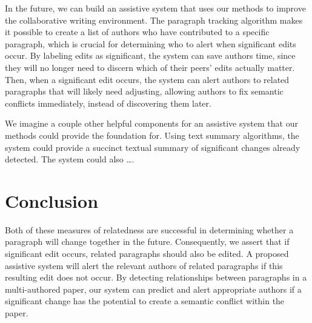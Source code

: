 In the future, we can build an assistive system that uses our methods to
improve the collaborative writing environment. The paragraph tracking
algorithm makes it possible to create a list of authors who have
contributed to a specific paragraph, which is crucial for determining
who to alert when significant edits occur. By labeling edits as
significant, the system can save authors time, since they will no longer
need to discern which of their peers' edits actually matter. Then, when
a significant edit occurs, the system can alert authors to related
paragraphs that will likely need adjusting, allowing authors to fix
semantic conflicts immediately, instead of discovering them later.

We imagine a couple other helpful components for an assistive system
that our methods could provide the foundation for. Using text summary
algorithms, the system could provide a succinct textual summary of
significant changes already detected. The system could also \ldots{}.

\section{Conclusion}\label{conclusion}

Both of these measures of relatedness are successful in determining
whether a paragraph will change together in the future. Consequently, we
assert that if significant edit occurs, related paragraphs should also
be edited. A proposed assistive system will alert the relevant authors
of related paragraphs if this resulting edit does not occur. By
detecting relationships between paragraphs in a multi-authored paper,
our system can predict and alert appropriate authors if a significant
change has the potential to create a semantic conflict within the paper.
